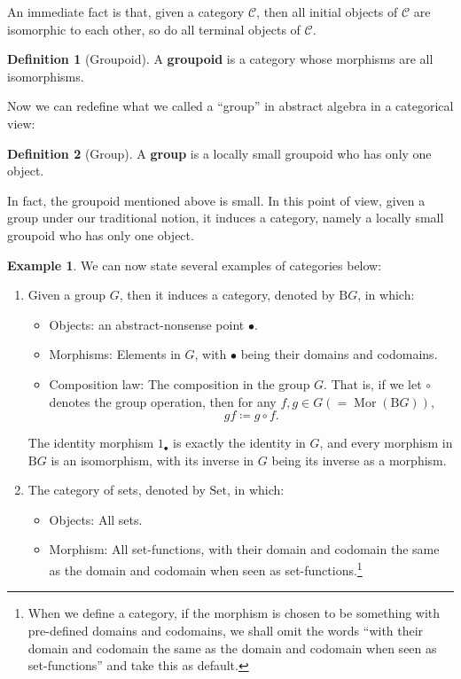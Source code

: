 \documentclass{article}
\theoremstyle{definition}
\newtheorem{definition}{Definition}[section]
\theoremstyle{definition}
\newtheorem{example}{Example}[section]
\theoremstyle{remark}
\DeclareMathOperator{\Mor}{Mor}
\begin{document}
An immediate fact is that, given a category $\mathcal{C}$, then all initial objects of $\mathcal{C}$ are isomorphic to each other, so do all terminal objects of $\mathcal{C}$.
	\begin{definition}[Groupoid]
	A \textbf{groupoid} is a category whose morphisms are all isomorphisms.
	\end{definition}
	Now we can redefine what we called a ``group'' in abstract algebra in a categorical view:
	\begin{definition}[Group]
	A \textbf{group} is a locally small groupoid who has only one object.
	\end{definition}
	In fact, the groupoid mentioned above is small. In this point of view, given a group under our traditional notion, it induces a category, namely a locally small groupoid who has only one object. 
	\begin{example}
	 We can now state several examples of categories below:
	\begin{enumerate}[label=(\roman*)]
	\item Given a group $G$, then it induces a category, denoted by $\mathrm{B}G$, in which:
		\begin{itemize}
			\item Objects: an abstract-nonsense point $\bullet$.
			\item Morphisms: Elements in $G$, with $\bullet$ being their domains and codomains.
			\item Composition law: The composition in the group $G$. That is, if we let $\circ$ denotes the group operation, then for any $f,g\in G(=\Mor(\mathrm{B}G))$,
			\[gf\coloneqq g\circ f.\]
		\end{itemize}
	The identity morphism $1_\bullet$ is exactly the identity in $G$, and every morphism in $\mathrm{B}G$ is an isomorphism, with its inverse in $G$ being its inverse as a morphism.
	\item The category of sets, denoted by $\mathrm{Set}$, in which:
		\begin{itemize}
			\item Objects: All sets.
			\item Morphism: All set-functions, with their domain  and codomain the same as the domain and codomain when seen as set-functions.\footnote{When we define a category, if the morphism is chosen to be something with pre-defined domains and codomains, we shall omit the words ``with their domain  and codomain the same as the domain and codomain when seen as set-functions'' and take this as default.}

\end{itemize}
\end{enumerate}
\end{example}
\end{document}
